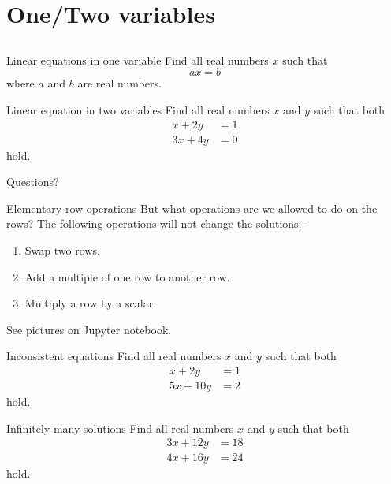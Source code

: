 \documentclass{beamer}
\begin{document}
\section{One/Two variables}
\subsection{}


\begin{frame}{Linear equations in one variable}
  Find all real numbers $x$ such that
  \begin{equation*}
    ax = b
  \end{equation*}
  where $a$ and $b$ are real numbers.
\end{frame}

\begin{frame}{Linear equation in two variables}
  Find all real numbers $x$ and $y$ such that both
  \begin{align*}
    x+2y&=1\\
    3x+4y&=0
  \end{align*}
  hold.
\end{frame}

\begin{frame}
  Questions?
\end{frame}

\begin{frame}{Elementary row operations}
  But what operations are we allowed to do on the rows?\vfill
  The following operations will not change the solutions:-\vfill
  \begin{enumerate}
  \item Swap two rows.\vfill
  \item Add a multiple of one row to another row.\vfill
  \item Multiply a row by a scalar.\vfill
  \end{enumerate}
  See pictures on Jupyter notebook.
\end{frame}

\begin{frame}{Inconsistent equations}
  Find all real numbers $x$ and $y$ such that both
  \begin{align*}
    x+2y&=1\\
    5x+10y&=2
  \end{align*}
  hold.
\end{frame}

\begin{frame}{Infinitely many solutions}
  Find all real numbers $x$ and $y$ such that both
  \begin{align*}
    3x+12y&=18\\
    4x+16y&=24
  \end{align*}
  hold.
\end{frame}
\end{document}
